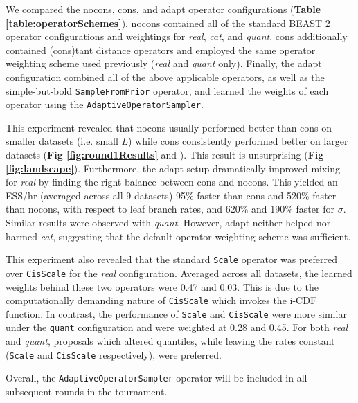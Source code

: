 \documentclass[10pt,letterpaper]{article}
\begin{document}
We compared the nocons, cons, and adapt operator configurations (\textbf{Table \ref{table:operatorSchemes}}).
nocons contained all of the standard BEAST 2 operator configurations and weightings for \textit{real}, \textit{cat}, and \textit{quant}.
cons additionally contained (cons)tant distance operators and employed the same operator weighting scheme used previously \cite{zhang2020improving} (\textit{real} and \textit{quant} only). 
Finally, the adapt configuration combined all of the above applicable operators, as well as the simple-but-bold \texttt{SampleFromPrior} operator, and learned the weights of each operator using the  \texttt{AdaptiveOperatorSampler}.



This experiment revealed that nocons usually performed better than cons on smaller datasets (i.e. small $L$) while cons consistently performed better on larger datasets (\textbf{Fig \ref{fig:round1Results}} and \textbf{}). 
This result is unsurprising (\textbf{Fig \ref{fig:landscape}}).
Furthermore, the adapt setup dramatically improved mixing for \textit{real} by finding the right balance between cons and nocons.
This yielded an ESS/hr (averaged across all 9 datasets) 95\% faster than cons and 520\% faster than nocons, with respect to leaf branch rates, and 620\% and 190\% faster for $\sigma$.
Similar results were observed with \textit{quant}.
However, adapt neither helped nor harmed \textit{cat}, suggesting that the default operator weighting scheme was sufficient.


This experiment also revealed that the standard \texttt{Scale} operator was preferred over \texttt{CisScale} for the \textit{real} configuration. Averaged across all datasets, the learned weights behind these two operators were 0.47 and 0.03.
This is due to the computationally demanding nature of \texttt{CisScale} which invokes the i-CDF function.
In contrast, the performance of \texttt{Scale} and \texttt{CisScale} were more similar under the \texttt{quant} configuration and were weighted at 0.28 and 0.45.
For both \textit{real} and \textit{quant}, proposals which altered quantiles, while leaving the rates constant (\texttt{Scale} and \texttt{CisScale} respectively), were preferred.


Overall, the \texttt{AdaptiveOperatorSampler} operator will be included in all subsequent rounds in the tournament. 
\end{document}
